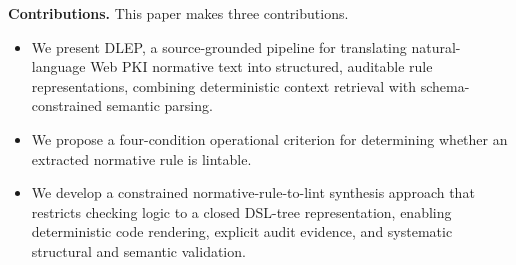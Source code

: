 \noindent\textbf{Contributions.}
This paper makes three contributions.
\begin{itemize}
    \item 
    We present DLEP, a source-grounded pipeline for translating natural-language Web PKI normative text into structured, auditable rule representations, combining deterministic context retrieval with schema-constrained semantic parsing.
    \item We propose a four-condition operational criterion for determining whether an extracted normative rule is lintable.
    \item 
    We develop a constrained normative-rule-to-lint synthesis approach that restricts checking logic to a closed DSL-tree representation, enabling deterministic code rendering, explicit audit evidence, and systematic structural and semantic validation.
\end{itemize}
